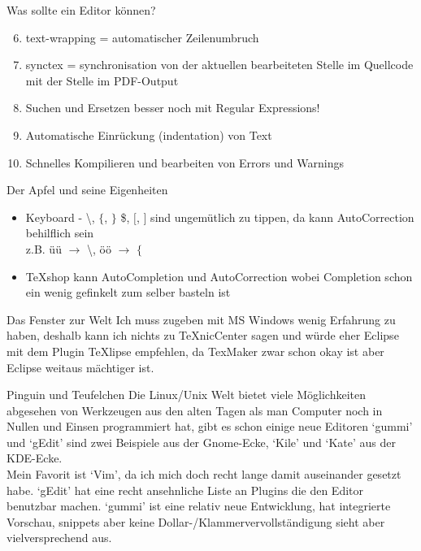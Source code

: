 \documentclass{beamer}
\begin{document}
\begin{frame}{Was sollte ein Editor können?}
    \begin{enumerate}\setcounter{enumi}{5}
        \item text-wrapping = automatischer Zeilenumbruch
        \item synctex = synchronisation von der aktuellen bearbeiteten Stelle im
              Quellcode mit der Stelle im PDF-Output
        \item Suchen und Ersetzen besser noch mit Regular Expressions!
        \item Automatische Einrückung (indentation) von Text
        \item Schnelles Kompilieren und bearbeiten von Errors und Warnings
    \end{enumerate}
\end{frame}

\begin{frame}{Der Apfel und seine Eigenheiten}
    \begin{itemize}
        \item Keyboard - \backslash, $\{$, $\}$ \$, $[$, $]$ sind ungemütlich zu
            tippen, da kann AutoCorrection behilflich sein\\
            z.B. üü $→$ \backslash, öö $→$ $\{$
        \item TeXshop kann AutoCompletion und AutoCorrection wobei Completion schon
            ein wenig gefinkelt zum selber basteln ist
    \end{itemize}
\end{frame}

\begin{frame}{Das Fenster zur Welt}
    Ich muss zugeben mit MS Windows wenig Erfahrung zu haben, deshalb kann ich
    nichts zu TeXnicCenter sagen und würde eher Eclipse mit dem Plugin TeXlipse
    empfehlen, da TexMaker zwar schon okay ist aber Eclipse weitaus mächtiger
    ist.
\end{frame}

\begin{frame}{Pinguin und Teufelchen}
    Die Linux/Unix Welt bietet viele Möglichkeiten abgesehen von Werkzeugen aus
    den alten Tagen als man Computer noch in Nullen und Einsen programmiert hat,
    gibt es schon einige neue Editoren ‘gummi’ und ‘gEdit’ sind zwei Beispiele
    aus der Gnome-Ecke, ‘Kile’ und ‘Kate’ aus der KDE-Ecke.\\

    Mein Favorit ist ‘Vim’, da ich mich doch recht lange damit
    auseinander gesetzt habe. ‘gEdit’ hat eine recht ansehnliche Liste an
    Plugins die den Editor benutzbar machen. ‘gummi’ ist eine relativ neue
    Entwicklung, hat integrierte Vorschau, snippets aber keine Dollar-/Klammervervollständigung
    sieht aber vielversprechend aus.
\end{frame}
\end{document}

